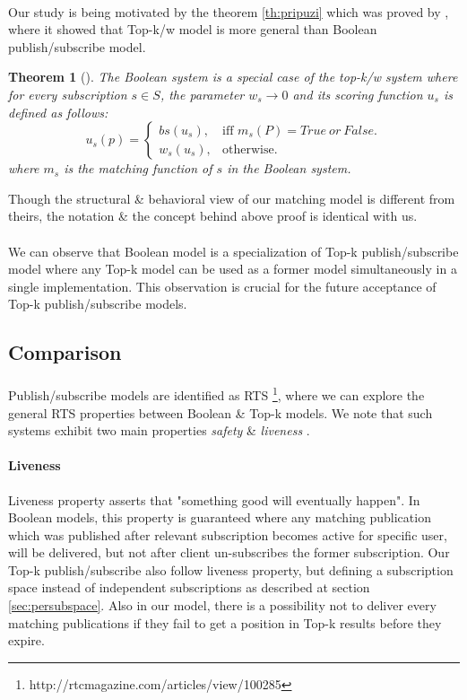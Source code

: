 \documentclass[a4paper,12pt,oneside]{book}
\newtheorem{theorem}{Theorem}[section]
\theoremstyle{definition}
\theoremstyle{remark}
\begin{document}
\paragraph*{}
Our study is being motivated by the theorem \ref{th:pripuzi} which was proved by \cite{Pripuzic2010}, where it showed that Top-k/w model is more general than Boolean publish/subscribe model.
\begin{theorem}[\label{th:pripuzi}]
The Boolean system is a special case of the top-k/w system where for every subscription $s\in S$, the parameter $w_s \rightarrow 0$ and its scoring function $u_s$ is defined as follows:
\begin{equation}
  \text{$u_s(p)$}= \begin{cases}
    \text{$bs(u_s)$}, & \text{iff $m_s(P)=True\ or\ False$}.\\
    \text{$w_s(u_s)$}, & \text{otherwise}.
  \end{cases}
\end{equation}
where $m_s$ is the matching function of $s$ in the Boolean system.
\end{theorem}
Though the structural \& behavioral view of our matching model is different from theirs, the notation \& the concept behind above proof is identical with us.

\paragraph*{}
We can observe that Boolean model is a specialization of Top-k publish/subscribe model where any Top-k model can be used as a former model simultaneously in a single implementation. This observation is crucial for the future acceptance of Top-k publish/subscribe models.  

\subsection{Comparison}
\label{sec:comparisonbtop}
\paragraph*{}
Publish/subscribe models are identified as \ac{RTS} \footnote{http://rtcmagazine.com/articles/view/100285}, where we can explore the general \ac{RTS} properties between Boolean \& Top-k models. We note that such systems exhibit two main properties \emph{safety} \& \emph{liveness} \cite{Sistla1985}.

\paragraph*{Liveness}
Liveness property asserts that "something good will eventually happen". In Boolean models, this property is guaranteed where any matching publication which was published after relevant subscription becomes active for specific user, will be delivered, but not after client un-subscribes the former subscription. Our Top-k publish/subscribe also follow liveness property, but defining a subscription space instead of independent subscriptions as described at section \ref{sec:persubspace}. Also in our model, there is a possibility not to deliver every matching publications if they fail to get a position in Top-k results before they expire.
\end{document}
